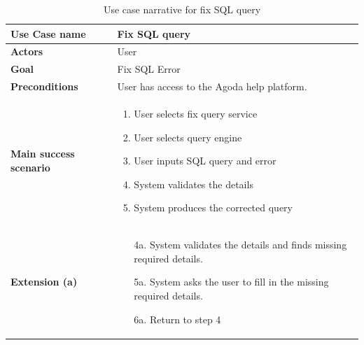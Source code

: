     \begin{table}[H]
        \centering
        \caption{Use case narrative for fix SQL query}
        \label{tbl:use-case-fix-sql}
        \begin{tabular}{|p{4cm}|p{10cm}|}
        \hline
        \textbf{Use Case name} & Fix SQL query \\
        \hline
        \textbf{Actors} & User \\
        \hline
        \textbf{Goal} & Fix SQL Error \\
        \hline
        \textbf{Preconditions} & User has access to the Agoda help platform. \\
        \hline
        \textbf{Main success scenario} &
        \begin{enumerate}
            \item User selects fix query service
            \item User selects query engine
            \item User inputs SQL query and error
            \item System validates the details
            \item System produces the corrected query
        \end{enumerate}
        \\
        \hline
        \textbf{Extension (a)} &
        \begin{enumerate}
            \item[4a.] System validates the details and finds missing required details.
            \item[5a.] System asks the user to fill in the missing required details.
            \item[6a.] Return to step 4
        \end{enumerate}
        \\
        \hline
        \end{tabular}
    \end{table}

